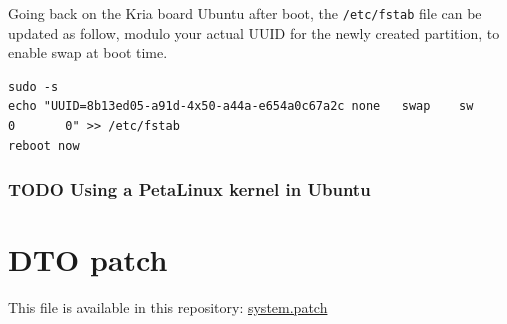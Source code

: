 \documentclass[10pt]{article}
\begin{document}
Going back on the Kria board Ubuntu after boot, the \texttt{/etc/fstab} file can be
updated as follow, modulo your actual UUID for the newly created partition, to
enable swap at boot time.
\begin{verbatim}
sudo -s
echo "UUID=8b13ed05-a91d-4x50-a44a-e654a0c67a2c none   swap    sw      0       0" >> /etc/fstab
reboot now
\end{verbatim}

\subsubsection{{\bfseries\sffamily TODO} Using a PetaLinux kernel in Ubuntu}
\label{sec:orgb39b985}


\pagebreak
\appendix
\section{DTO patch}
\label{sec:orgf0d3655}
This file is available in this repository: \href{https://gitlab.com/sunoc/xilinx-kria-kv260-documentation/-/blob/b7300116e153f4b5a1542f8804e4646db8030033/src/system.patch}{system.patch}
\inputminted[linenos, frame=single]{diff}{./src/system.patch}
\end{document}
